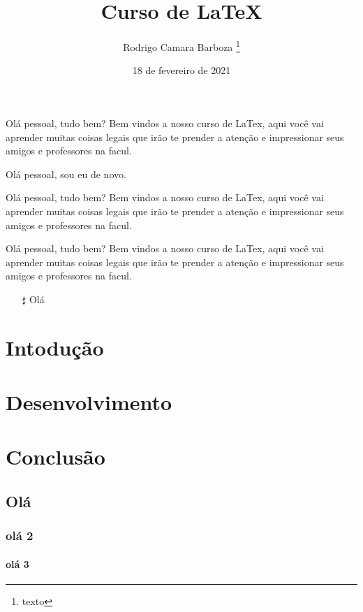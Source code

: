 \documentclass[12pt,a4paper, oneside]{book}
\title{Curso de LaTeX}
\author {Rodrigo Camara Barboza \footnote{texto}}
\date{18 de fevereiro de 2021}
\begin{document}
\maketitle

Olá pessoal, tudo bem? Bem vindos a nosso curso de LaTex, aqui você vai aprender muitas coisas legais que irão te prender a atenção e impressionar seus amigos e professores na facul. 

\singlespacing
Olá pessoal, sou eu de novo.

\onehalfspacing
Olá pessoal, tudo bem? Bem vindos a nosso curso de LaTex, aqui você vai aprender muitas coisas legais que irão te prender a atenção e impressionar seus amigos e professores na facul. 

\doublespacing
Olá pessoal, tudo bem? Bem vindos a nosso curso de LaTex, aqui você vai aprender muitas coisas legais que irão te prender a atenção e impressionar seus amigos e professores na facul. \newline

\begin{itemize}
	
	\item[$\sharp$] Olá  %

\end{itemize}

\chapter{Intodução}

\chapter{Desenvolvimento}

\chapter{Conclusão}

\section{Olá}

\subsection{olá 2}

\subsubsection{olá 3}
\end{document}
